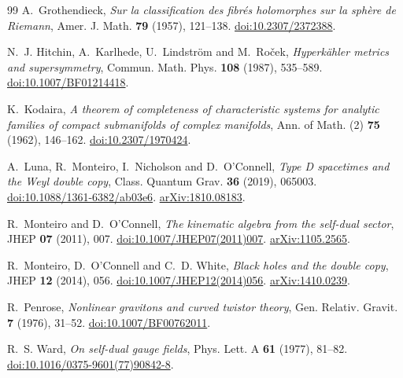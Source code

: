 \documentclass[11pt]{article}
\numberwithin{equation}{section}
\theoremstyle{definition}
\theoremstyle{remark}
\begin{document}
\begin{thebibliography}{99}
A.~Grothendieck,
\emph{Sur la classification des fibr\'es holomorphes sur la sph\`ere de Riemann},
Amer. J. Math. \textbf{79} (1957), 121--138.
\href{https://doi.org/10.2307/2372388}{doi:10.2307/2372388}.

N.~J. Hitchin, A.~Karlhede, U.~Lindstr\"om and M.~Ro\v{c}ek,
\emph{Hyperk\"ahler metrics and supersymmetry},
Commun. Math. Phys. \textbf{108} (1987), 535--589.
\href{https://doi.org/10.1007/BF01214418}{doi:10.1007/BF01214418}.

K.~Kodaira,
\emph{A theorem of completeness of characteristic systems for analytic families of compact submanifolds of complex manifolds},
Ann. of Math. (2) \textbf{75} (1962), 146--162.
\href{https://doi.org/10.2307/1970424}{doi:10.2307/1970424}.

A.~Luna, R.~Monteiro, I.~Nicholson and D.~O'Connell,
\emph{Type D spacetimes and the Weyl double copy},
Class. Quantum Grav. \textbf{36} (2019), 065003.
\href{https://doi.org/10.1088/1361-6382/ab03e6}{doi:10.1088/1361-6382/ab03e6}.
\href{https://arxiv.org/abs/1810.08183}{arXiv:1810.08183}.

R.~Monteiro and D.~O'Connell,
\emph{The kinematic algebra from the self-dual sector},
JHEP \textbf{07} (2011), 007.
\href{https://doi.org/10.1007/JHEP07(2011)007}{doi:10.1007/JHEP07(2011)007}.
\href{https://arxiv.org/abs/1105.2565}{arXiv:1105.2565}.

R.~Monteiro, D.~O'Connell and C.~D. White,
\emph{Black holes and the double copy},
JHEP \textbf{12} (2014), 056.
\href{https://doi.org/10.1007/JHEP12(2014)056}{doi:10.1007/JHEP12(2014)056}.
\href{https://arxiv.org/abs/1410.0239}{arXiv:1410.0239}.

R.~Penrose,
\emph{Nonlinear gravitons and curved twistor theory},
Gen. Relativ. Gravit. \textbf{7} (1976), 31--52.
\href{https://doi.org/10.1007/BF00762011}{doi:10.1007/BF00762011}.

R.~S. Ward,
\emph{On self-dual gauge fields},
Phys. Lett. A \textbf{61} (1977), 81--82.
\href{https://doi.org/10.1016/0375-9601(77)90842-8}{doi:10.1016/0375-9601(77)90842-8}.

\end{thebibliography}
\end{document}
